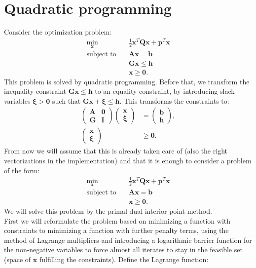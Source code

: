 \documentclass[11pt, a4paper, parskip=half*, bibliography=totoc, cleardoublepage=empty, final,
numbers=noenddot]{scrbook}
\begin{document}
\chapter{Quadratic programming} \label{ch:qp}
Consider the optimization problem:
\begin{align}
\min_{\bm{x}} \quad &\frac{1}{2} \bm{x}^T \bm{Q} \bm{x} + \bm{p}^T \bm{x}   \\
\text{subject to} \quad &\bm{A} \bm{x} = \bm{b} \\
                  &\bm{G} \bm{x} \leq \bm{h} \\
                  &\bm{x} \geq \bm{0}.
\end{align} 
This problem is solved by quadratic programming. Before that, we transform the inequality constraint $\bm{G} \bm{x} \leq \bm{h}$ to an equality constraint, by introducing slack variables $\bm{\xi} >\bm{0}$ such that  \mbox{$\bm{G} \bm{x} + \bm{\xi} \leq \bm{h}$}. This transforms the constraints to:
\begin{align}
\begin{pmatrix}
\bm{A} & \bm{0} \\
\bm{G} & \bm{I}
\end{pmatrix} 
\begin{pmatrix}
\bm{x} \\
\bm{\xi}
\end{pmatrix} 
&= 
\begin{pmatrix}
\bm{b} \\
\bm{h}
\end{pmatrix}, \\
\begin{pmatrix}
\bm{x} \\
\bm{\xi}
\end{pmatrix} 
&\geq \bm{0}.
\end{align} 
From now we will assume that this is already taken care of (also the right vectorizations in the implementation) and that it is enough to consider a problem of the form:
\begin{align}
\min_{\bm{x}} \quad &\frac{1}{2} \bm{x}^T \bm{Q} \bm{x} + \bm{p}^T \bm{x}   \\
\text{subject to} \quad &\bm{A} \bm{x} = \bm{b} \\
                  &\bm{x} \geq \bm{0}.
\end{align}
We will solve this problem by the primal-dual interior-point method.\\
First we will reformulate the problem based on minimizing a function with constraints to minimizing a function with further penalty terms, using the method of Lagrange multipliers and introducing a logarithmic barrier function for the non-negative variables to force almost all iterates to stay in the feasible set (space of $\bm{x}$ fulfilling the constraints). Define the Lagrange function:
\end{document}
